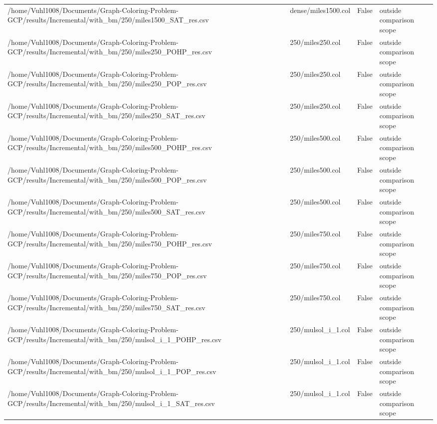 \begin{table}[htbp]
\begin{tabular}{llll}
/home/Vuhl1008/Documents/Graph-Coloring-Problem-GCP/results/Incremental/with\_bm/250/miles1500\_SAT\_res.csv & dense/miles1500.col & False & outside comparison scope \\
/home/Vuhl1008/Documents/Graph-Coloring-Problem-GCP/results/Incremental/with\_bm/250/miles250\_POHP\_res.csv & 250/miles250.col & False & outside comparison scope \\
/home/Vuhl1008/Documents/Graph-Coloring-Problem-GCP/results/Incremental/with\_bm/250/miles250\_POP\_res.csv & 250/miles250.col & False & outside comparison scope \\
/home/Vuhl1008/Documents/Graph-Coloring-Problem-GCP/results/Incremental/with\_bm/250/miles250\_SAT\_res.csv & 250/miles250.col & False & outside comparison scope \\
/home/Vuhl1008/Documents/Graph-Coloring-Problem-GCP/results/Incremental/with\_bm/250/miles500\_POHP\_res.csv & 250/miles500.col & False & outside comparison scope \\
/home/Vuhl1008/Documents/Graph-Coloring-Problem-GCP/results/Incremental/with\_bm/250/miles500\_POP\_res.csv & 250/miles500.col & False & outside comparison scope \\
/home/Vuhl1008/Documents/Graph-Coloring-Problem-GCP/results/Incremental/with\_bm/250/miles500\_SAT\_res.csv & 250/miles500.col & False & outside comparison scope \\
/home/Vuhl1008/Documents/Graph-Coloring-Problem-GCP/results/Incremental/with\_bm/250/miles750\_POHP\_res.csv & 250/miles750.col & False & outside comparison scope \\
/home/Vuhl1008/Documents/Graph-Coloring-Problem-GCP/results/Incremental/with\_bm/250/miles750\_POP\_res.csv & 250/miles750.col & False & outside comparison scope \\
/home/Vuhl1008/Documents/Graph-Coloring-Problem-GCP/results/Incremental/with\_bm/250/miles750\_SAT\_res.csv & 250/miles750.col & False & outside comparison scope \\
/home/Vuhl1008/Documents/Graph-Coloring-Problem-GCP/results/Incremental/with\_bm/250/mulsol\_i\_1\_POHP\_res.csv & 250/mulsol\_i\_1.col & False & outside comparison scope \\
/home/Vuhl1008/Documents/Graph-Coloring-Problem-GCP/results/Incremental/with\_bm/250/mulsol\_i\_1\_POP\_res.csv & 250/mulsol\_i\_1.col & False & outside comparison scope \\
/home/Vuhl1008/Documents/Graph-Coloring-Problem-GCP/results/Incremental/with\_bm/250/mulsol\_i\_1\_SAT\_res.csv & 250/mulsol\_i\_1.col & False & outside comparison scope \\

\end{tabular}
\end{table}
